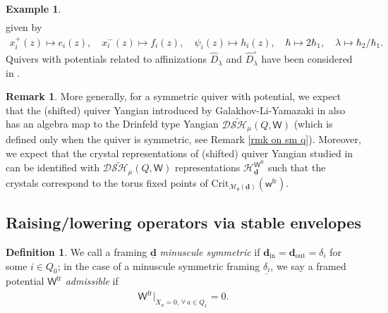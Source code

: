 \documentclass[10pt]{amsart}
\theoremstyle{definition}
\newtheorem{Definition}[Theorem]{Definition}
\newtheorem{Remark}[Theorem]{Remark}
\newtheorem{Example}[Theorem]{Example}
\numberwithin{equation}{section}
\newcommand{\Crit}{\mathrm{Crit}}
\newcommand{\bC}{\mathbb{C}}
\newcommand{\bd}{\mathbf{d}}
\newcommand{\cH}{\mathcal{H}}
\newcommand{\cM}{\mathcal{M}}
\newcommand{\sT}{\mathsf{T}}
\newcommand{\sW}{\mathsf{W}}
\newcommand{\sw}{\mathsf{w}}
\newcommand{\In}{\operatorname{in}}
\newcommand{\Out}{\operatorname{out}}
\newcommand{\yh}[1]{\textcolor{red}{$[$ Yehao: #1 $]$}}
\begin{document}
\begin{Example}
\begin{gather*}
\end{gather*}
given by 
\begin{align*}
x^+_i(z)\mapsto e_i(z),\quad x^-_i(z)\mapsto f_i(z),\quad \psi_i(z)\mapsto h_i(z),\quad\hbar\mapsto 2\hbar_1,\quad\lambda\mapsto \hbar_2/\hbar_1.
\end{align*}
Quivers with potentials related to affinizations $\widehat{D}_\lambda$ and $\widehat{D}^\circ_\lambda$ have been considered in \cite{Bao}.
\end{Example}

\begin{Remark}\label{rmk on quiver Yangian}
More generally, for a symmetric quiver with potential, we expect that the (shifted) quiver Yangian introduced by Galakhov-Li-Yamazaki in \cite{GLY, LY} also has an algebra map to 
the Drinfeld type Yangian $\mathcal D\widetilde{\mathcal{SH}}_\mu(Q,\sW)$ (which is defined only when the quiver is symmetric, see Remark \ref{rmk on sm q}). Moreover, we expect that the crystal representations of (shifted) quiver Yangian studied in \cite{GLY, LY, L} can be identified with $\mathcal D\widetilde{\mathcal{SH}}_\mu(Q,\sW)$ representations $\cH^{\sW^{\mathrm{fr}}}_{\underline{\bd}}$ such that the crystals correspond to the torus fixed points of $\Crit_{\cM_\theta(\underline{\bd})}(\sw^{\mathrm{fr}})$.
\end{Remark}

\subsection{Raising/lowering operators via stable envelopes}



\begin{Definition}\label{def on adm pot}
We call a framing $\underline{\bd}$ \textit{minuscule symmetric} if $\bd_{\In}=\bd_{\Out}=\delta_i$ for some $i\in Q_0$; in the case of a minuscule symmetric framing $\underline{\delta_i}$, we say a framed potential $\sW^{\mathrm{fr}}$ \textit{admissible} if 
\begin{align*}
    \mathsf W^{\mathrm{fr}}\big|_{X_a=0,\,\forall\,a\in Q_1}=0.
\end{align*}
\end{Definition}
\end{document}

